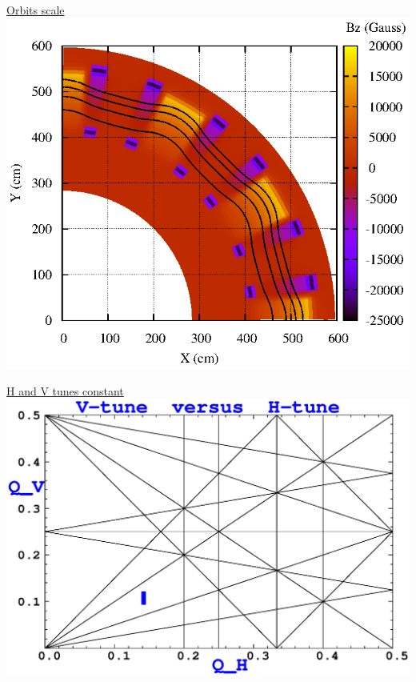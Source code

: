 \documentclass[12pt]{article}
\newcommand{\blue}{\color{blue}}
\begin{document}
\begin{minipage}{.63\linewidth}
\begin{minipage}{.499\linewidth}
\end{minipage}\hspace{0mm}


\begin{minipage}{1\linewidth}
\begin{minipage}{.499\linewidth}
\centering 
\blue
\underline{Orbits scale} \\[-3ex]
 \includegraphics[width=.8\linewidth]{./figs_FFAG_introSlides/Quadrant.eps}
\end{minipage}\hspace{0mm}
\begin{minipage}{.499\linewidth}
\blue
\underline{H and V tunes constant} \\[0ex]
 \includegraphics*[bbllx=20,bblly=90,bburx=567,bbury=457,width=.7\linewidth]{./figs_FFAG_introSlides/tuneDiag_50traj.eps}
\end{minipage}\hspace{0mm}


\end{minipage}\hspace{0mm}



\end{minipage}
\end{document}
